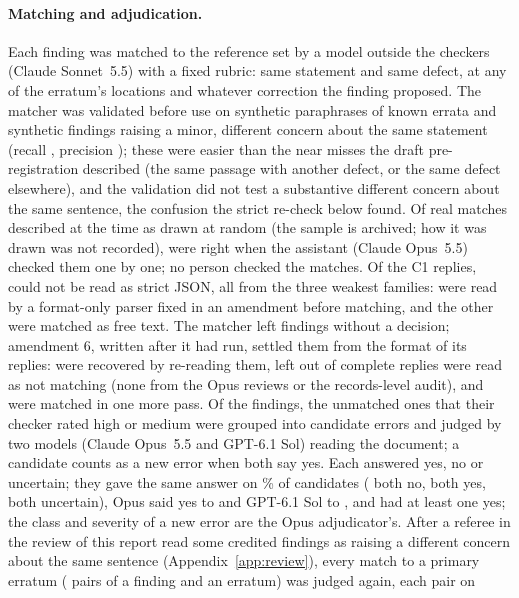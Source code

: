 \documentclass[11pt]{article}
\begin{document}
\paragraph{Matching and adjudication.} Each finding was matched to the reference set by a model outside the checkers (Claude
Sonnet~5.5) with a fixed rubric: same statement and same defect, at any of the erratum's locations and whatever correction the finding
proposed. The matcher was validated before use on \ValPos{} synthetic
paraphrases of known errata and \ValNeg{} synthetic findings raising a minor, different concern about the same statement (recall
\ValRecall, precision \ValPrecision); these were easier than the near misses the draft pre-registration described (the same passage
with another defect, or the same defect elsewhere), and the validation did not test a substantive different concern about the same
sentence, the confusion the strict re-check below found. Of \HandN{} real matches described at the time as drawn at random (the sample is archived; how it was drawn was not
recorded), \HandCorrect{} were right when the assistant (Claude Opus~5.5) checked them one by one; no person checked the matches. Of the \NreplyCone{} C1 replies,
\NparseRecovered{} could not be read as strict JSON, all from the three weakest families: \NparseLenient{} were read by a format-only parser fixed in an
amendment before matching, and the other \NfreeText{} were matched as free text. The matcher left \NmatchUndecided{} findings without a decision;
amendment 6, written after it had run, settled them from the format of its replies: \NmatchRecovered{} were recovered by re-reading
them, \NmatchOmitted{} left out of complete replies were read as not matching (none from the Opus reviews or the records-level
audit), and \NmatchFilled{} were matched in one more pass. Of the \Nfindings{} findings, the \NunmatchedHM{} unmatched ones that
their checker rated high or medium were grouped into \Nclusters{} candidate errors and judged by two models (Claude Opus~5.5 and
GPT-6.1 Sol) reading the document; a candidate counts as a new error when both say yes. Each answered yes, no or uncertain; they gave the same answer on
\AdjAgree\% of candidates (\AdjBothNo{} both no, \Nnew{} both yes, \AdjBothUnc{} both uncertain), Opus said yes to \AdjOpusYes{} and
GPT-6.1 Sol to \AdjGptYes, and \AdjEitherYes{} had at least one yes; the class and severity of a new error are the Opus
adjudicator's. After a referee in the review of this report read some credited findings as raising a different concern about the
same sentence (Appendix~\ref{app:review}), every match to a primary erratum (\StrictPairs{} pairs of a finding and an erratum) was judged again, each pair on
\end{document}
